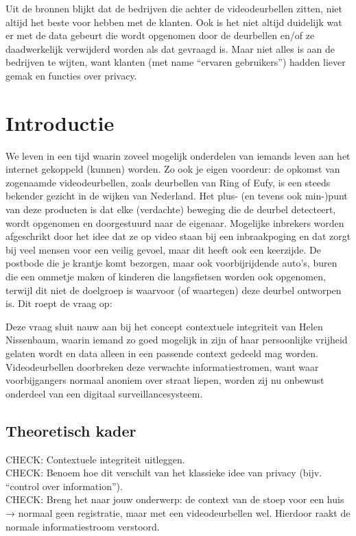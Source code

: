 \documentclass[nonacm, sigconf]{acmart}
\begin{document}
    Uit de bronnen blijkt dat de bedrijven die achter de videodeurbellen zitten, niet altijd het beste voor hebben met de klanten.
    Ook is het niet altijd duidelijk wat er met de data gebeurt die wordt opgenomen door de deurbellen en/of ze daadwerkelijk verwijderd worden als dat gevraagd is.
    Maar niet alles is aan de bedrijven te wijten, want klanten (met name ``ervaren gebruikers'') hadden liever gemak en functies over privacy.


    \section{Introductie}
    We leven in een tijd waarin zoveel mogelijk onderdelen van iemands leven aan het internet gekoppeld (kunnen) worden.
    Zo ook je eigen voordeur: de opkomst van zogenaamde videodeurbellen, zoals deurbellen van Ring of Eufy, is een steeds bekender gezicht in de wijken van Nederland.
    Het plus- (en tevens ook min-)punt van deze producten is dat elke (verdachte) beweging die de deurbel detecteert, wordt opgenomen en doorgestuurd naar de eigenaar.
    Mogelijke inbrekers worden afgeschrikt door het idee dat ze op video staan bij een inbraakpoging en dat zorgt bij veel mensen voor een veilig gevoel, maar dit heeft ook een keerzijde.
    De postbode die je krantje komt bezorgen, maar ook voorbijrijdende auto's, buren die een ommetje maken of kinderen die langsfietsen worden ook opgenomen, terwijl dit niet de doelgroep is waarvoor (of waartegen) deze deurbel ontworpen is.
    Dit roept de vraag op:


    Deze vraag sluit nauw aan bij het concept contextuele integriteit van Helen Nissenbaum, waarin iemand zo goed mogelijk in zijn of haar persoonlijke vrijheid gelaten wordt en data alleen in een passende context gedeeld mag worden.
    Videodeurbellen doorbreken deze verwachte informatiestromen, want waar voorbijgangers normaal anoniem over straat liepen, worden zij nu onbewust onderdeel van een digitaal surveillancesysteem.

    \subsection{Theoretisch kader}
    \begin{editorsonlyBox}
        CHECK: Contextuele integriteit uitleggen.\\
        CHECK: Benoem hoe dit verschilt van het klassieke idee van privacy (bijv. ``control over information'').\\
        CHECK: Breng het naar jouw onderwerp: de context van de stoep voor een huis → normaal geen registratie, maar met een videodeurbellen wel. Hierdoor raakt de normale informatiestroom verstoord.
    \end{editorsonlyBox}
\end{document}
